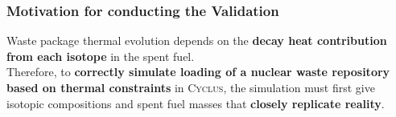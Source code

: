 \begin{frame}
    \frametitle{Motivation for conducting the Validation}
    Waste package thermal evolution depends on the \textbf{decay heat contribution from each isotope} in the spent fuel. 
    \\
    
    Therefore, to \textbf{correctly simulate loading of a nuclear waste repository based on thermal constraints} in \textsc{Cyclus}, the simulation must first give isotopic compositions and spent fuel masses that \textbf{closely replicate reality}. 

  \end{frame}
  